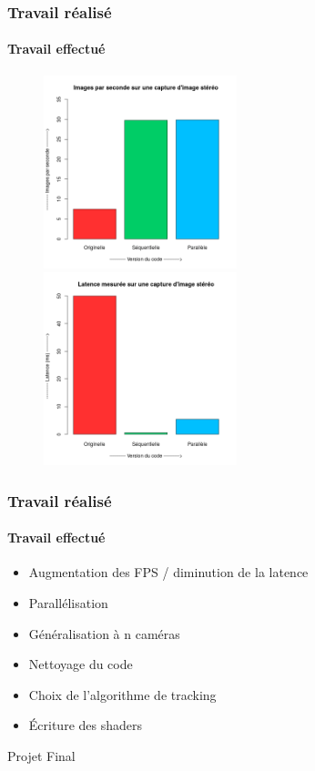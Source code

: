 \documentclass[12pt]{beamer}
\begin{document}
\begin{frame}
\frametitle{Travail réalisé}
\framesubtitle{Travail effectué}
\begin{figure}
\includegraphics[width=0.5\textwidth]{../Rapport/Modules/Picture/fps.png}
\includegraphics[width=0.5\textwidth]{../Rapport/Modules/Picture/latence.png}
\end{figure}
\end{frame}

\begin{frame}
\frametitle{Travail réalisé}
\framesubtitle{Travail effectué}
\begin{itemize}
\item Augmentation des FPS / diminution de la latence
\item Parallélisation
\item Généralisation à n caméras
\item Nettoyage du code
\item Choix de l'algorithme de tracking
\item Écriture des shaders
\end{itemize}
\end{frame}

\begin{frame}
\Huge{\centerline{Projet Final}}
\end{frame}
\end{document}

